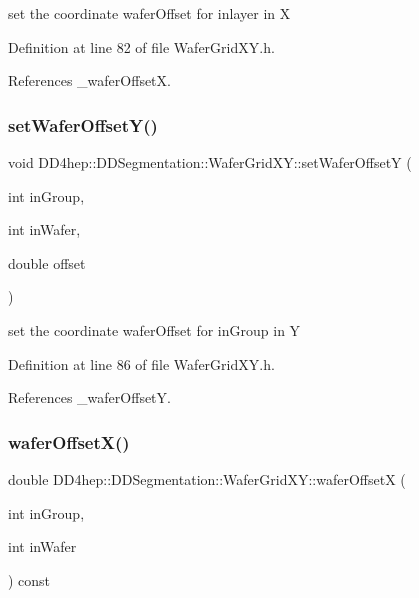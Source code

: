 set the coordinate wafer\+Offset for inlayer in X 



Definition at line 82 of file Wafer\+Grid\+X\+Y.\+h.



References \+\_\+wafer\+OffsetX.

\hypertarget{class_d_d4hep_1_1_d_d_segmentation_1_1_wafer_grid_x_y_acb1ddfacb3dd3702f7e7102cc29d3930}{}\label{class_d_d4hep_1_1_d_d_segmentation_1_1_wafer_grid_x_y_acb1ddfacb3dd3702f7e7102cc29d3930} 
\subsubsection{\texorpdfstring{set\+Wafer\+Offset\+Y()}{setWaferOffsetY()}}
{\footnotesize\ttfamily void D\+D4hep\+::\+D\+D\+Segmentation\+::\+Wafer\+Grid\+X\+Y\+::set\+Wafer\+OffsetY (\begin{DoxyParamCaption}\item[{int}]{in\+Group,  }\item[{int}]{in\+Wafer,  }\item[{double}]{offset }\end{DoxyParamCaption})\hspace{0.3cm}{\ttfamily [inline]}}



set the coordinate wafer\+Offset for in\+Group in Y 



Definition at line 86 of file Wafer\+Grid\+X\+Y.\+h.



References \+\_\+wafer\+OffsetY.

\hypertarget{class_d_d4hep_1_1_d_d_segmentation_1_1_wafer_grid_x_y_ab616e7d7aa7ba612425194875aab11bb}{}\label{class_d_d4hep_1_1_d_d_segmentation_1_1_wafer_grid_x_y_ab616e7d7aa7ba612425194875aab11bb} 
\subsubsection{\texorpdfstring{wafer\+Offset\+X()}{waferOffsetX()}}
{\footnotesize\ttfamily double D\+D4hep\+::\+D\+D\+Segmentation\+::\+Wafer\+Grid\+X\+Y\+::wafer\+OffsetX (\begin{DoxyParamCaption}\item[{int}]{in\+Group,  }\item[{int}]{in\+Wafer }\end{DoxyParamCaption}) const\hspace{0.3cm}{\ttfamily [inline]}}




